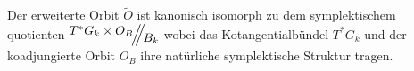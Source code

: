 \begin{comment}
\begin{beh}
$\dim(\tilde O)=\dim(O)+2n$
\end{beh}
\end{comment}
\begin{comment}
\ccite[p27]{thboalch}
\[
\Theta :=\left\{ A\in\mathfrak g_k^*\mid (g_0,A)\in\tilde O
  \text{ für ein passendes } g_0\in\GL_n(\C) \right\}
\]
ist der Kern der Projektion
\[
\tilde O\to\mathfrak g_k^*;\qquad (g_0,A)\mapsto A
\]
\begin{cor}
\ccite[Corollary 2.15]{thboalch}
The extended orbit $\tilde O$ is a principal $T$ bundle over $\theta$.
\end{cor}
\end{comment}
\begin{comment}
Wie sieht denn die $B_k$ Wirkung auf $T^*G_k\times O_B$ aus?\\
Siehe: \cite[Definition 1.47]{thboalch}
\begin{defn} \ccite[Definition 1.47]{thboalch}
Die \emph{links Wirkung} von $G$ auf $T^*G$ ist \comm{(in terms of left
trivialisation)}:
\[
\beta(g,A)=(\beta g,A)\,.
\]
Die \emph{rechts Wirkung} \dots
\end{defn}
\begin{lem} \ccite[Lemma 1.48]{thboalch}
Die links Wirkung von $G$ auf $T^*G$ ist Hamiltonisch mit einer
equivarianten momenten Abbildung gegeben \comm{(in terms of left
trivialisation)} durch
\[
\mu_L:G\times\mathfrak g^* \to \mathfrak g^*; \qquad (g,A)\mapsto -\Ad_g^*(A)
\]
Die rechts Wirkung \dots
\end{lem}
Und $B_k$ wirkt auf $O_B$ durch Konjungation.\\
Damit ergibt sich zusammen die $B_k$ Wirkung auf $T^*G_k\times O_B$ durch
\[
\beta(g,A,B)=(\beta g,A,\beta B\beta^{-1})
\]
\end{comment}
\begin{lem}
Der erweiterte Orbit $\tilde O$ ist kanonisch isomorph zu dem symplektischem
quotienten $\symplquot{T^*G_k\times O_B}{B_k}$ wobei das Kotangentialbündel
$T^*G_k$ und der koadjungierte Orbit $O_B$ ihre natürliche symplektische
Struktur tragen.
\begin{comment}
Entspricht
\cite[Proposition 2.19]{thboalch}
zusammen mit
\cite[Remark 2.20]{thboalch}
\end{comment}
\end{lem}
